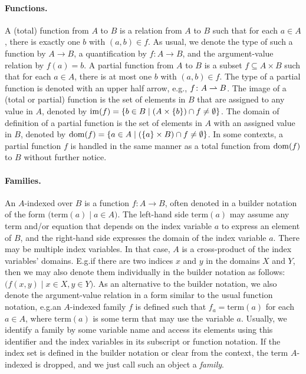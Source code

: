 \documentclass[../document.tex]{subfiles}
\begin{document}
    \paragraph{Functions.}
    A (total) function from \(A\) to \(B\) is a relation from \(A\) to \(B\) such that for each \(a \in A\), there is exactly one \(b\) with \((a,b) \in f\).
    As usual, we denote the type of such a function by \(A \to B\), a quantification by \(f\colon A \to B\), and the argument-value relation by \(f(a) = b\).
    A partial function from \(A\) to \(B\) is a subset \(f \subseteq A \times B\) such that for each \(a \in A\), there is at most one \(b\) with \((a,b) \in f\).
    The type of a partial function is denoted with an upper half arrow, e.g., \(f\colon A \rightharpoonup B\).
    The image of a (total or partial) function is the set of elements in \(B\) that are assigned to any value in \(A\), denoted by \(\operatorname{im}(f) = \{b\in B \mid (A \times \{b\}) \cap f \neq \emptyset\}\).
    The domain of definition of a partial function is the set of elements in \(A\) with an assigned value in \(B\), denoted by \(\operatorname{dom}(f) = \{a\in A \mid (\{a\} \times B) \cap f \neq \emptyset\}\).
    In some contexts, a partial function \(f\) is handled in the same manner as a total function from \(\operatorname{dom}(f)\) to \(B\) without further notice.

    \paragraph{Families.}
    An \(A\)-indexed  over \(B\) is a function \(f\colon A \to B\), often  denoted in a builder notation of the form \(\big(\mathrm{term}(a) \mid a \in A\big)\).
    The left-hand side \(\mathrm{term}(a)\) may assume any term and/or equation that depends on the index variable \(a\) to express an element of \(B\), and the right-hand side expresses the domain of the index variable \(a\).
    There may be multiple index variables. In that case, \(A\) is a cross-product of the index variables' domains.
    E.g.\@ if there are two indices \(x\) and \(y\) in the domains \(X\) and \(Y\), then we may also denote them individually in the builder notation as follows: \(\big( f(x,y) \mid x \in X, y \in Y \big)\).
    As an alternative to the builder notation, we also denote the argument-value relation in a form similar to the usual function notation, e.g.\@ an \(A\)-indexed family \(f\) is defined such that \(f_a = \mathrm{term}(a)\) for each \(a \in A\), where \(\mathrm{term}(a)\) is some term that may use the variable \(a\).
    Usually, we identify a family by some variable name and access its elements using this identifier and the index variables in its subscript or function notation.
    If the index set is defined in the builder notation or clear from the context, the term \(A\)-indexed is dropped, and we just call such an object a \emph{family}.
\end{document}
